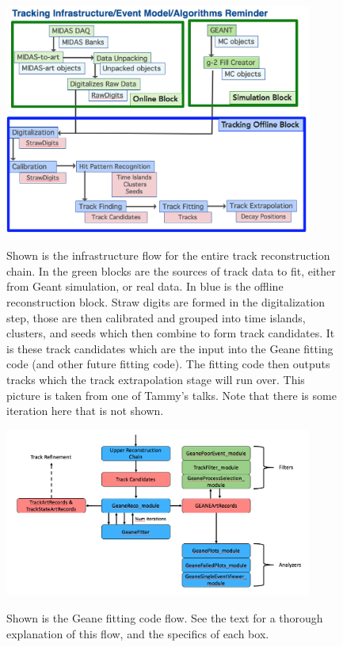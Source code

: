\documentclass{article}
\begin{document}
\begin{figure}[]
\caption{Shown is the infrastructure flow for the entire track reconstruction chain. In the green blocks are the sources of track data to fit, either from Geant simulation, or real data. In blue is the offline reconstruction block. Straw digits are formed in the digitalization step, those are then calibrated and grouped into time islands, clusters, and seeds which then combine to form track candidates. It is these track candidates which are the input into the Geane fitting code (and other future fitting code). The fitting code then outputs tracks which the track extrapolation stage will run over. This picture is taken from one of Tammy's talks. Note that there is some iteration here that is not shown.}
\centering
\includegraphics[width=0.9\textwidth]{TrackInfrastructure}
\label{fig:Infrastructure}
\end{figure}

\begin{figure}[]
\caption{Shown is the Geane fitting code flow. See the text for a thorough explanation of this flow, and the specifics of each box.}
\centering
\hspace{15mm}
\includegraphics[width=0.9\textwidth]{GeaneFlow}
\label{fig:GeaneFlow}
\end{figure}
\end{document}
